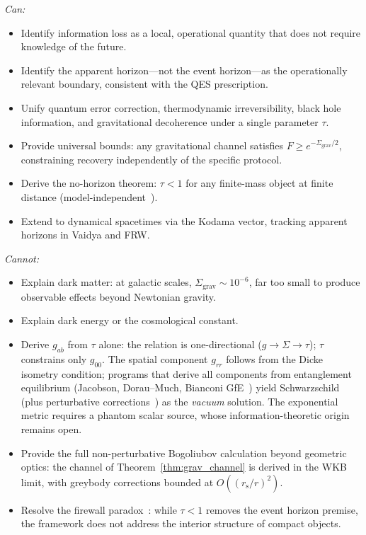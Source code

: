 \documentclass[prl,twocolumn,superscriptaddress,longbibliography,floatfix]{revtex4-2}
\newcommand{\tauasym}{\tau}
\newcommand{\rs}{r_{\mathrm{s}}}
\newcommand{\Sgrav}{\Sigma_{\mathrm{grav}}}
\begin{document}
\emph{Can:}
\begin{itemize}
\item Identify information loss as a local, operational
  quantity that does not require knowledge of the future.
\item Identify the apparent horizon---not the event
  horizon---as the operationally relevant boundary,
  consistent with the QES prescription.
\item Unify quantum error correction, thermodynamic
  irreversibility, black hole information, and gravitational
  decoherence under a single parameter $\tauasym$.
\item Provide universal bounds: any gravitational channel
  satisfies $F \geq e^{-\Sgrav/2}$, constraining recovery
  independently of the specific protocol.
\item Derive the no-horizon theorem: $\tauasym < 1$ for any
  finite-mass object at finite distance
  (model-independent~\cite{JRSWW2018}).
\item Extend to dynamical spacetimes via the Kodama vector,
  tracking apparent horizons in Vaidya and FRW.
\end{itemize}

\emph{Cannot:}
\begin{itemize}
\item Explain dark matter: at galactic scales,
  $\Sgrav \sim 10^{-6}$, far too small to produce observable
  effects beyond Newtonian gravity.
\item Explain dark energy or the cosmological constant.
\item Derive $g_{ab}$ from $\tauasym$ alone: the relation is
  one-directional ($g \to \Sigma \to \tauasym$); $\tauasym$
  constrains only $g_{00}$.
  The spatial component $g_{rr}$ follows from the Dicke
  isometry condition; programs that derive all components
  from entanglement equilibrium
  (Jacobson, Dorau--Much, Bianconi GfE~\cite{Bianconi2025})
  yield Schwarzschild (plus perturbative
  corrections~\cite{Thattarampilly2026}) as the
  \emph{vacuum} solution.
  The exponential metric requires a phantom scalar source,
  whose information-theoretic origin remains open.
\item Provide the full non-perturbative Bogoliubov calculation
  beyond geometric optics: the channel of
  Theorem~\ref{thm:grav_channel} is derived in the WKB limit,
  with greybody corrections bounded at $O((\rs/r)^2)$.
\item Resolve the firewall paradox~\cite{AMPS2013}: while
  $\tauasym < 1$ removes the event horizon premise, the
  framework does not address the interior structure of compact
  objects.
\end{itemize}
\end{document}
